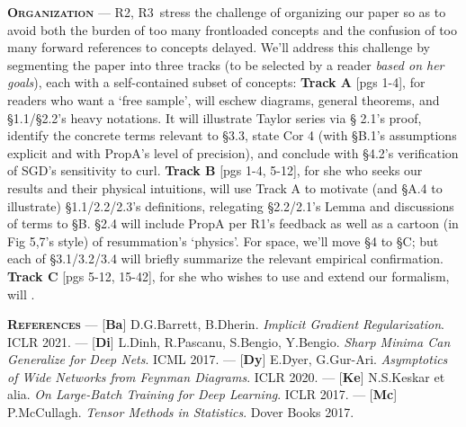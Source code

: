 \documentclass{article}
\newcommand{\Ra}{\textmd{\textsf{\color{purple!50} {R1}}}}
\newcommand{\Rb}{\textmd{\textsf{\color{green!50}  {R2}}}}
\newcommand{\Rc}{\textmd{\textsf{\color{blue!50}   {R3}}}}
\newcommand{\cor}[1]{\textmd{\textsf{Cor #1}}}
\newcommand{\fig}[1]{\textmd{\textsf{Fig #1}}}
\newcommand{\prp}[1]{\textmd{\textsf{Prop#1}}}
\newcommand{\cit}[1]{[\textbf{#1}]}
\newcommand{\moosect}[1]{\par\textsc{\textbf{#1}} ---}
\begin{document}
\moosect{Organization}
    \Rb,\Rc\ stress the challenge of 
    organizing our paper so as to avoid both the burden of too many
    frontloaded concepts and the confusion of too many forward references to
    concepts delayed.  We'll address this challenge by segmenting the paper
    into three tracks (to be selected by a reader \emph{based on her goals}), each
    with a self-contained subset of concepts: 
    \textbf{Track A} [pgs 1-4], for readers who want a `free sample', will
    eschew diagrams, general theorems, and \S1.1/\S2.2's heavy notations.  It will illustrate Taylor series via \S
    2.1's proof, identify the concrete terms relevant to \S 3.3, state \cor{4}
    (with \S B.1's assumptions explicit and with \prp{A}'s level of precision),
    and conclude with \S 4.2's verification of SGD's sensitivity to curl.  
    \textbf{Track B} [pgs 1-4, 5-12], for she who seeks our results and their
    physical intuitions, will use Track A to motivate (and \S A.4 to
    illustrate) \S1.1/2.2/2.3's definitions, relegating \S2.2/2.1's Lemma and
    discussions of terms to \S B.  \S 2.4 will include \prp{A} per \Ra's
    feedback as well as a cartoon (in \fig{5,7}'s style) of resummation's
    `physics'.  For space, we'll move \S 4 to \S C; but each of \S 3.1/3.2/3.4
    will briefly summarize the relevant empirical confirmation.
    \textbf{Track C} [pgs 5-12, 15-42], for she who wishes to use and extend
    our formalism, will {\color{moor}{FILL IN}}.

\moosect{References}
    \cit{Ba} D.G.Barrett, B.Dherin.  \emph{Implicit Gradient Regularization}.  ICLR 2021.
    ---
    \cit{Di} L.Dinh, R.Pascanu, S.Bengio, Y.Bengio.  \emph{Sharp Minima Can Generalize for Deep Nets}.  ICML 2017.
    ---
    \cit{Dy} E.Dyer, G.Gur-Ari.  \emph{Asymptotics of Wide Networks from Feynman Diagrams}.  ICLR 2020.
    ---
    \cit{Ke} N.S.Keskar et alia.  \emph{On Large-Batch Training for Deep Learning}.  ICLR 2017.
    ---
    \cit{Mc} P.McCullagh.  \emph{Tensor Methods in Statistics}.  Dover Books 2017.
\end{document}
